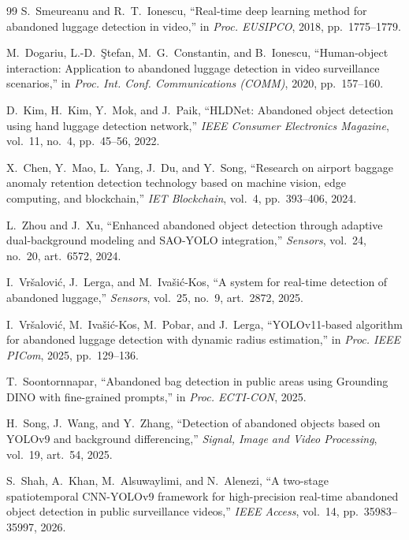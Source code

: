 \begin{thebibliography}{99}
S.~Smeureanu and R.~T.~Ionescu, ``Real-time deep learning method for abandoned
luggage detection in video,'' in \emph{Proc. EUSIPCO}, 2018, pp.~1775--1779.

M.~Dogariu, L.-D.~\c{S}tefan, M.~G.~Constantin, and B.~Ionescu,
``Human-object interaction: Application to abandoned luggage detection in video
surveillance scenarios,'' in \emph{Proc. Int. Conf. Communications (COMM)},
2020, pp.~157--160.

D.~Kim, H.~Kim, Y.~Mok, and J.~Paik, ``HLDNet: Abandoned object detection using
hand luggage detection network,'' \emph{IEEE Consumer Electronics Magazine},
vol.~11, no.~4, pp.~45--56, 2022.

X.~Chen, Y.~Mao, L.~Yang, J.~Du, and Y.~Song, ``Research on airport baggage
anomaly retention detection technology based on machine vision, edge computing,
and blockchain,'' \emph{IET Blockchain}, vol.~4, pp.~393--406, 2024.

L.~Zhou and J.~Xu, ``Enhanced abandoned object detection through adaptive
dual-background modeling and SAO-YOLO integration,'' \emph{Sensors}, vol.~24,
no.~20, art.~6572, 2024.

I.~Vr\v{s}alovi\'{c}, J.~Lerga, and M.~Iva\v{s}i\'{c}-Kos, ``A system for
real-time detection of abandoned luggage,'' \emph{Sensors}, vol.~25, no.~9,
art.~2872, 2025.

I.~Vr\v{s}alovi\'{c}, M.~Iva\v{s}i\'{c}-Kos, M.~Pobar, and J.~Lerga,
``YOLOv11-based algorithm for abandoned luggage detection with dynamic radius
estimation,'' in \emph{Proc. IEEE PICom}, 2025, pp.~129--136.

T.~Soontornnapar, ``Abandoned bag detection in public areas using Grounding DINO
with fine-grained prompts,'' in \emph{Proc. ECTI-CON}, 2025.

H.~Song, J.~Wang, and Y.~Zhang, ``Detection of abandoned objects based on
YOLOv9 and background differencing,'' \emph{Signal, Image and Video
Processing}, vol.~19, art.~54, 2025.

S.~Shah, A.~Khan, M.~Alsuwaylimi, and N.~Alenezi, ``A two-stage spatiotemporal
CNN-YOLOv9 framework for high-precision real-time abandoned object detection in
public surveillance videos,'' \emph{IEEE Access}, vol.~14, pp.~35983--35997,
2026.


\end{thebibliography}
